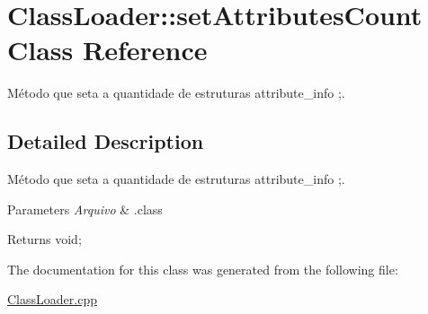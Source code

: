 \hypertarget{class_class_loader_1_1set_attributes_count}{}\section{Class\+Loader\+:\+:set\+Attributes\+Count Class Reference}
\label{class_class_loader_1_1set_attributes_count}


Método que seta a quantidade de estruturas attribute\+\_\+info ;.  




\subsection{Detailed Description}
Método que seta a quantidade de estruturas attribute\+\_\+info ;. 


\begin{DoxyParams}{Parameters}
{\em Arquivo} & .class \\
\hline
\end{DoxyParams}
\begin{DoxyReturn}{Returns}
void; 
\end{DoxyReturn}


The documentation for this class was generated from the following file\+:\begin{DoxyCompactItemize}
\item 
\hyperlink{_class_loader_8cpp}{Class\+Loader.\+cpp}\end{DoxyCompactItemize}
